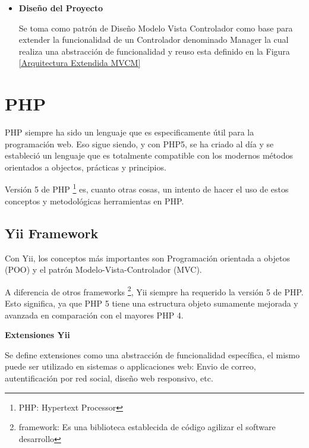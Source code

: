 \begin{itemize}

\item \textbf{Dise\~{n}o del Proyecto}

Se toma como patr\'{o}n de Dise\~{n}o Modelo Vista Controlador como base para 
extender la funcionalidad de un Controlador denominado Manager la cual realiza
una abstracci\'{o}n de funcionalidad y reuso esta definido en la Figura 
\ref{Arquitectura Extendida MVCM}

\begin{minipage}{1.0\textwidth}
	\centering
	\label{Arquitectura Extendida MVCM}
\end{minipage}


\end{itemize}

\section{PHP}

PHP siempre ha sido un lenguaje que es especificamente \'{u}til para la programaci\'{o}n
web. Eso sigue siendo, y con PHP5, se ha criado al d\'{i}a y se estableci\'{o} un lenguaje
que es totalmente compatible con los modernos m\'{e}todos orientados a objectos, 
pr\'{a}cticas y principios. 

Versi\'{o}n 5 de PHP \footnote{PHP: Hypertext Processor} es, cuanto otras cosas, un intento
de hacer el uso de estos conceptos y metodol\'{o}gicas herramientas en PHP.\cite{reiersol2007php}

\subsection{Yii Framework}

Con Yii, los conceptos m\'{a}s importantes son Programaci\'{o}n orientada a objetos
(POO) y el patr\'{o}n Modelo-Vista-Controlador (MVC).

A diferencia de otros frameworks \footnote{framework: Es una biblioteca establecida
de c\'{o}digo agilizar el software desarrollo}, Yii siempre ha requerido la 
versi\'{o}n 5 de PHP. Esto significa, ya que PHP 5 tiene una estructura objeto sumamente mejorada y
avanzada en comparaci\'{o}n con el mayores PHP 4. \cite{ullman2013yii}

\textbf{Extensiones Yii}

Se define extensiones como una abstracci\'{o}n de funcionalidad espec\'{i}fica, el
mismo puede ser utilizado en sistemas o applicaciones web: Envio de correo, 
autentificaci\'{o}n por red social, dise\~{n}o web responsivo, etc.

